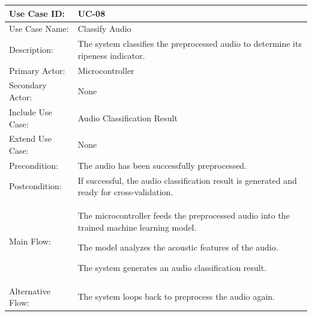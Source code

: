 \begin{thesisprose}
\FloatBarrier
\begingroup
\small
\setlength{\tabcolsep}{3pt}
\renewcommand{\arraystretch}{1.14}
\setlength{\arrayrulewidth}{0.625pt}
\def\LTcaptype{uncaptionedgrid}
\begin{longtable}{|>{\raggedright\arraybackslash}p{}|>{\raggedright\arraybackslash}p{}|}
\hline
Use Case ID: & UC-08 \\
\hline
Use Case Name: & Classify Audio \\
\hline
Description: & The system classifies the preprocessed audio to determine its ripeness indicator. \\
\hline
Primary Actor: & Microcontroller \\
\hline
Secondary Actor: & None \\
\hline
Include Use Case: & Audio Classification Result \\
\hline
Extend Use Case: & None \\
\hline
Precondition: & The audio has been successfully preprocessed. \\
\hline
Postcondition: & If successful, the audio classification result is generated and ready for cross-validation. \\
\hline
Main Flow: & The microcontroller feeds the preprocessed audio into the trained machine learning model.\par The model analyzes the acoustic features of the audio.\par The system generates an audio classification result. \\
\hline
Alternative Flow: & The system loops back to preprocess the audio again. \\
\hline
\end{longtable}
\endgroup


\end{thesisprose}
